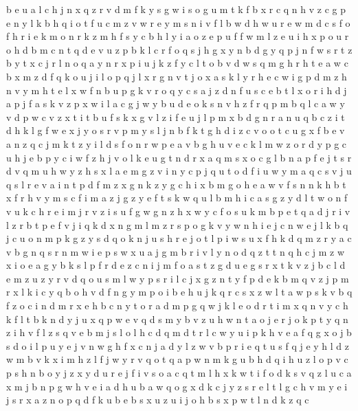 \documentclass{article}
\begin{document}
b e u a l c h j n x q z r v d m f k y s g w
i s o g u m t k f b x r c q n h v z
c g p e n y l k b h q i o t f u
c m z v w
r e y m s n i v f l b w d h
w
u r e w m d c s f o
f h r i e k m o n
r k z
m h f s y c b
h l y i a o z e p u f
f w m l
z e u i h x p
o u
r o h d b m c n t
q
d e v u z p b k l c r f o q s j h g x y n
b d g y q p j n f w s r t z
b y t x c j r l n o q
a y
n r x p i u j k z f y c l t o b v d w s q m g h
r h t e a w c b x m z d f q k o u j i l
o p q j l x r g
n v t j o x a s k l y r h e c w i g p d
m z h n v y
m h t e l x w f n b u p g k v r o q y c s a j z d
n f u s c e b t l x o r i h d j a p
j f a s k v z p x w i
l a c g j w y b u d e o k s n v h z f r q p m
b q l c a w y v d p
w c v z x t
i t b u f s k x g v l
z i f e u j l p m x b d g n r
a n u q b c z i t d h k l g f w e x j y o s r v p m
y s l j n b f k t g h d i z c v o
o t c u g x f b e v a n z
q c j m k t z y i l d s f o n r w p e a v b g h u
v e c k l m w z o r d y
p g c u h j e
b p y c i w f z h j v o l k e u g t n d r x a q m s
x o c g l b n a p f e j t s r d v q m u h w y z
h s x l a e m g z v i n y c p j q u t o d f
i u w y m a q c s v
j u q s l r e v a i n t p
d f m z x g n
k z y g c h
i x b m g o h e a w v f s n
n k h b
t x f r h v y m
s c f i m a z
j g z y e f t s k w q u l b m h i c
a s g z y d l t w o n f v u k c h r e i m j
r v z i s u f g
w
g n z h x w y c f o s u k m b p e t q a d j r i v l
z r b t p e f v j i q k d x n g m l
m z r s p o g k v y w n h i e j c
n w e j l k
b q j c u o n m p k g z y s
d q o k n j u s h r
e j o t l p i w s u x f h k d q m z r y a c v b g n
q s r n m w i e
p s w x u a j g m b r i v l y n o d q z t
t n q h c j m z w x i o e a g y b k s l p f r d
e z c n i j m f o a s t
z g d
u e g s r x t k v z j b c l d
e m z
u z y r v d
q o u s m l w y p
s r i l c j x g z n t y f p d e k b m q v
z j p m r x l k i c y q b o h
v d f n g y m p o i b e h u j k q r c s x z w l t a
w p s k v b q f z o c i n d m r x e
h b c n y t o r a d m p g q w j k l e
o d r t i m x q n v y c h k f
l t b k n d y
j u x q p w e v
q d s m y b v z u h w n t a o j e
r j o k p t y q n z i h v
f l z s q v e b m
j s
l o
l h c d q m
d t r l c w y u i p k h v e a f q g x o j b s
d o i l p u y e j v n w g
h f x c n j a d y l z w v b p r i e q t u
s f q j e y h l d z w m b v k x i
m h z l f j w y r v q o
t q
a p w n m k g u b h d q i
h u z l o p v c
p s
h n b o y j z x
y d u r e j f i v s o a c q t m l h x k w
t i f o d k s v q z l u c a x m j b n p g w h
v e i a d h u
b a w q o g x d k c j y z s r e l
t l g c h v m y e i j s r x a z n o p q d f k u b
e b s x u z
u
i j o h b s x p w t l n d k z q c
\end{document}
